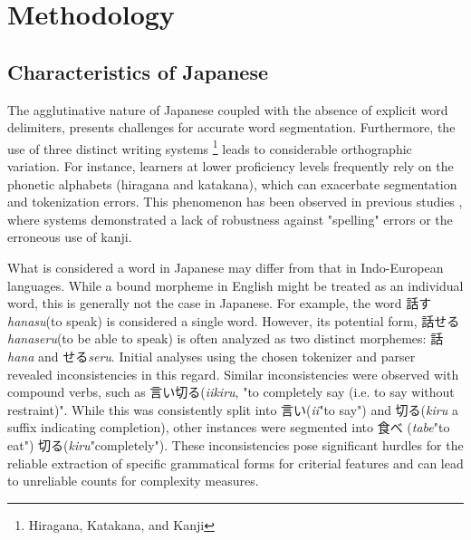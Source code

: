 \chapter{Methodology}
\section{Characteristics of Japanese}

The agglutinative nature of Japanese coupled with the absence of explicit word delimiters, presents challenges for
accurate word segmentation. Furthermore, the use of three distinct writing systems
\footnote{Hiragana, Katakana, and Kanji} leads to considerable orthographic variation. For instance, learners at
lower proficiency levels frequently rely on the phonetic alphabets (hiragana and katakana), which can exacerbate
segmentation and tokenization errors. This phenomenon has been observed in previous studies
\citep{yang1998, nagata2009}, where systems demonstrated a lack of robustness against "spelling" errors or the
erroneous use of kanji.

What is considered a word in Japanese may differ from that in Indo-European languages. While a bound morpheme in
English might be treated
as an individual word, this is generally not the case in Japanese. For example, the word 話す\textit{hanasu}(to speak)
is considered a single word. However, its potential form, 話せる \textit{hanaseru}(to be able to speak) is often
analyzed as
two distinct morphemes: 話\textit{hana} and せる\textit{seru}. Initial analyses using the chosen tokenizer and parser
revealed inconsistencies in this regard. Similar inconsistencies were observed with compound verbs, such as
言い切る(\textit{iikiru}, "to completely say (i.e. to say without restraint)". While this was
consistently
split into 言い(\textit{ii}"to say") and 切る(\textit{kiru} a suffix indicating completion), other instances were
segmented into
食べ (\textit{tabe}"to eat") 切る(\textit{kiru}"completely"). These inconsistencies pose significant hurdles for the
reliable extraction of specific grammatical forms for criterial features and can lead to unreliable counts for
complexity measures.

